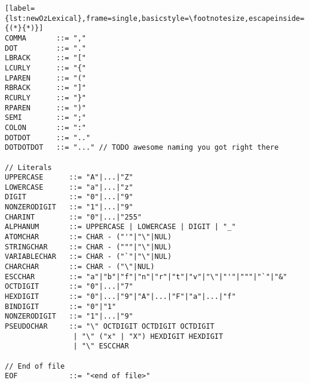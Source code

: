 \begin{lstlisting}[label={lst:newOzLexical},frame=single,basicstyle=\footnotesize,escapeinside={(*}{*)}]
COMMA       ::= ","
DOT         ::= "."
LBRACK      ::= "["
LCURLY      ::= "{"
LPAREN      ::= "("
RBRACK      ::= "]"
RCURLY      ::= "}"
RPAREN      ::= ")"
SEMI        ::= ";"
COLON       ::= ":"
DOTDOT      ::= ".."
DOTDOTDOT   ::= "..." // TODO awesome naming you got right there

// Literals
UPPERCASE      ::= "A"|...|"Z"
LOWERCASE      ::= "a"|...|"z"
DIGIT          ::= "0"|...|"9"
NONZERODIGIT   ::= "1"|...|"9"
CHARINT        ::= "0"|...|"255"
ALPHANUM       ::= UPPERCASE | LOWERCASE | DIGIT | "_"
ATOMCHAR       ::= CHAR - ("'"|"\"|NUL)
STRINGCHAR     ::= CHAR - ("""|"\"|NUL)
VARIABLECHAR   ::= CHAR - ("`"|"\"|NUL)
CHARCHAR       ::= CHAR - ("\"|NUL)
ESCCHAR        ::= "a"|"b"|"f"|"n"|"r"|"t"|"v"|"\"|"'"|"""|"`"|"&"
OCTDIGIT       ::= "0"|...|"7"
HEXDIGIT       ::= "0"|...|"9"|"A"|...|"F"|"a"|...|"f"
BINDIGIT       ::= "0"|"1"
NONZERODIGIT   ::= "1"|...|"9"
PSEUDOCHAR     ::= "\" OCTDIGIT OCTDIGIT OCTDIGIT
                | "\" ("x" | "X") HEXDIGIT HEXDIGIT
                | "\" ESCCHAR

// End of file
EOF            ::= "<end of file>"
\end{lstlisting}
